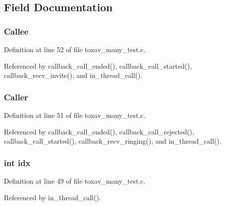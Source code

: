 \subsection{Field Documentation}
\hypertarget{struct___a_call_ac9f376aa53c5e8c50a3ebd11c377f0dd}{
\subsubsection[{Callee}]{ Callee}}\label{struct___a_call_ac9f376aa53c5e8c50a3ebd11c377f0dd}


Definition at line 52 of file toxav\+\_\+many\+\_\+test.\+c.



Referenced by callback\+\_\+call\+\_\+ended(), callback\+\_\+call\+\_\+started(), callback\+\_\+recv\+\_\+invite(), and in\+\_\+thread\+\_\+call().

\hypertarget{struct___a_call_a51f82344f432ea82fc1a993d1f9cb018}{
\subsubsection[{Caller}]{ Caller}}\label{struct___a_call_a51f82344f432ea82fc1a993d1f9cb018}


Definition at line 51 of file toxav\+\_\+many\+\_\+test.\+c.



Referenced by callback\+\_\+call\+\_\+ended(), callback\+\_\+call\+\_\+rejected(), callback\+\_\+call\+\_\+started(), callback\+\_\+recv\+\_\+ringing(), and in\+\_\+thread\+\_\+call().

\hypertarget{struct___a_call_ae40354a1051342eb5a9db005715dcfa9}{
\subsubsection[{idx}]{\setlength{\rightskip}{0pt plus 5cm}int idx}}\label{struct___a_call_ae40354a1051342eb5a9db005715dcfa9}


Definition at line 49 of file toxav\+\_\+many\+\_\+test.\+c.



Referenced by in\+\_\+thread\+\_\+call().

